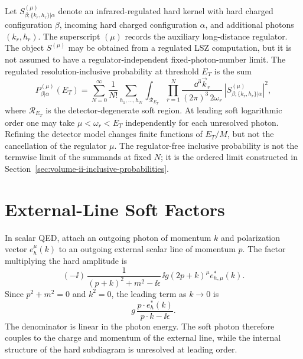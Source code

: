 \begin{definition}
Let \(S^{(\mu)}_{\beta;\{k_r,h_r\}|\alpha}\) denote an infrared-regulated hard
kernel with hard charged configuration \(\beta\), incoming hard charged
configuration \(\alpha\), and additional photons \((k_r,h_r)\).  The
superscript \((\mu)\) records the auxiliary long-distance regulator.  The
object \(S^{(\mu)}\) may be obtained from a regulated LSZ computation, but it
is not assumed to have a regulator-independent fixed-photon-number limit.  The
regulated resolution-inclusive probability at threshold \(E_T\) is the sum
\[
  P^{(\mu)}_{\beta|\alpha}(E_T)
  =
  \sum_{N=0}^{\infty}\frac1{N!}
  \sum_{h_1,\ldots,h_N}
  \int_{\mathcal R_{E_T}}
  \prod_{r=1}^{N}
  \frac{\dd^3\vec k_r}{(2\pi)^3\,2\omega_r}\,
  \left|
    S^{(\mu)}_{\beta;\{k_r,h_r\}|\alpha}
  \right|^2 ,
\]
where \(\mathcal R_{E_T}\) is the detector-degenerate soft region.  At leading
soft logarithmic order one may take \(\mu<\omega_r<E_T\) independently for
each unresolved photon.  Refining the detector model changes finite functions
of \(E_T/M\), but not the cancellation of the regulator \(\mu\).
The regulator-free inclusive probability is not the termwise limit of the
summands at fixed \(N\); it is the ordered limit constructed in
Section~\ref{sec:volume-ii-inclusive-probabilities}.
\end{definition}

\section{External-Line Soft Factors}

In scalar QED, attach an outgoing photon of momentum \(k\) and polarization
vector \(e_h^\mu(k)\) to an outgoing external scalar line of momentum \(p\).
The factor multiplying the hard amplitude is
\[
  (-\ii)\,
  \frac{1}{(p+k)^2+m^2-\ii\epsilon}\,
  \ii g(2p+k)^\mu e^*_{h,\mu}(k).
\]
Since \(p^2+m^2=0\) and \(k^2=0\), the leading term as \(k\to0\) is
\[
  g\,\frac{p\cdot e_h^*(k)}{p\cdot k-\ii\epsilon}.
\]
The denominator is linear in the photon energy.  The soft photon therefore
couples to the charge and momentum of the external line, while the internal
structure of the hard subdiagram is unresolved at leading order.

